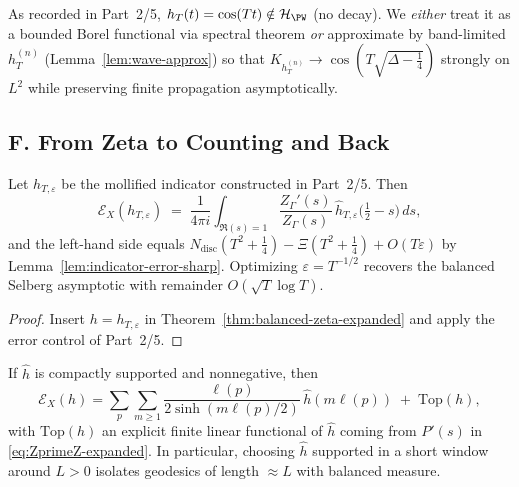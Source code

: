 \begin{remark}
As recorded in Part~2/5, $h_T(t)=\cos(Tt)\notin\mathcal H_{\PW}$ (no decay). We \emph{either} treat it as a bounded Borel functional via spectral theorem \emph{or} approximate by band-limited $h^{(n)}_T$ (Lemma~\ref{lem:wave-approx}) so that $K_{h^{(n)}_T}\to \cos(T\sqrt{\Delta-\tfrac14})$ strongly on $L^2$ while preserving finite propagation asymptotically.
\end{remark}


\subsection*{F. From Zeta to Counting and Back}
\label{subsec:zeta-counting-expanded}

\begin{proposition}
\label{prop:counting-zeta}
Let $h_{T,\varepsilon}$ be the mollified indicator constructed in Part~2/5. Then
\[
 \mathcal E_X(h_{T,\varepsilon})
 \;=\; \frac{1}{4\pi i}\int_{\Re(s)=1}\frac{Z_\Gamma'(s)}{Z_\Gamma(s)}\,
         \hat h_{T,\varepsilon}\!\Big(\tfrac12-s\Big)\,ds,
\]
and the left-hand side equals $N_{\mathrm{disc}}(T^2+\tfrac14)-\Xi(T^2+\tfrac14)+O(T\varepsilon)$ by Lemma~\ref{lem:indicator-error-sharp}. Optimizing $\varepsilon=T^{-1/2}$ recovers the balanced Selberg asymptotic with remainder $O(\sqrt{T}\log T)$.
\end{proposition}

\begin{proof}
Insert $h=h_{T,\varepsilon}$ in Theorem~\ref{thm:balanced-zeta-expanded} and apply the error control of Part~2/5.
\end{proof}

\begin{theorem}
\label{thm:prime-geodesic-balanced}
If $\hat h$ is compactly supported and nonnegative, then
\[
  \mathcal E_X(h)
  = \sum_{p}\sum_{m\ge 1} \frac{\ell(p)}{2\sinh(m\ell(p)/2)}\,\hat h(m\ell(p))
    \;+\; \mathrm{Top}(h),
\]
with $\mathrm{Top}(h)$ an explicit finite linear functional of $\hat h$ coming from $P'(s)$ in \eqref{eq:ZprimeZ-expanded}. In particular, choosing $\hat h$ supported in a short window around $L>0$ isolates geodesics of length $\approx L$ with balanced measure.
\end{theorem}

